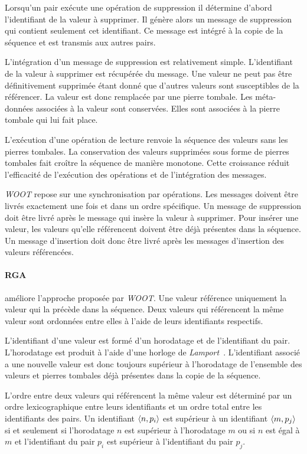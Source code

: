 Lorsqu'un pair exécute une opération de suppression il détermine d'abord l'identifiant de la valeur à supprimer.
Il génère alors un message de suppression qui contient seulement cet identifiant.
Ce message est intégré à la copie de la séquence et est transmis aux autres pairs.

L'intégration d'un message de suppression est relativement simple.
L'identifiant de la valeur à supprimer est récupérée du message.
Une valeur ne peut pas être définitivement supprimée étant donné que d'autres valeurs sont susceptibles de la référencer.
La valeur est donc remplacée par une pierre tombale.
Les méta-données associées à la valeur sont conservées.
Elles sont associées à la pierre tombale qui lui fait place.

L'exécution d'une opération de lecture renvoie la séquence des valeurs sans les pierres tombales.
La conservation des valeurs supprimées sous forme de pierres tombales fait croître la séquence de manière monotone.
Cette croissance réduit l'efficacité de l'exécution des opérations et de l'intégration des messages.

\emph{WOOT} repose sur une synchronisation par opérations.
Les messages doivent être livrés exactement une fois et dans un ordre spécifique.
Un message de suppression doit être livré après le message qui insère la valeur  à supprimer.
Pour insérer une valeur, les valeurs qu'elle référencent doivent être déjà présentes dans la séquence.
Un message d'insertion doit donc être livré après les messages d'insertion des valeurs référencées.


\paragraph{\acf{RGA}}\autocite{roh_2011_rga} améliore l'approche proposée par \emph{WOOT}.
Une valeur référence uniquement la valeur qui la précède dans la séquence.
Deux valeurs qui référencent la même valeur sont ordonnées entre elles à l'aide de leurs identifiants respectifs.

L'identifiant d'une valeur est formé d'un horodatage et de l'identifiant du pair.
L'horodatage est produit à l'aide d'une horloge de \emph{Lamport}~\autocite{lamport_1978_time}.
L'identifiant associé a une nouvelle valeur est donc toujours supérieur à l'horodatage de l'ensemble des valeurs et pierres tombales déjà présentes dans la copie de la séquence.

L'ordre entre deux valeurs qui référencent la même valeur est déterminé par un ordre lexicographique entre leurs identifiants et un ordre total entre les identifiants des pairs.
Un identifiant $\tuple*{n,p_i}$ est supérieur à un identifiant $\tuple*{m,p_j}$ si et seulement si l'horodatage $n$ est supérieur à l'horodatage $m$ ou si $n$ est égal à $m$ et l'identifiant du pair $p_i$ est supérieur à l'identifiant du pair $p_j$.

